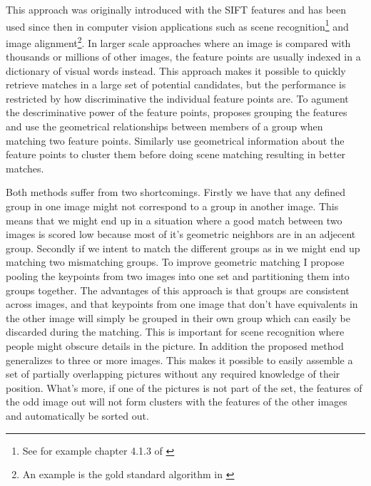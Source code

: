 \documentclass{article}
\begin{document}

 This approach was originally introduced with the SIFT features and has 
been used since then in computer vision applications such as scene 
recognition\footnote{See for example chapter 4.1.3 of \cite[pp.  
226]{szeliski2010}} and image alignment\footnote{An example is the gold 
standard algorithm in \cite[p.  114]{multipleView}}.  In larger scale 
approaches where an image is compared with thousands or millions of 
other images, the feature points are usually indexed in a dictionary of 
visual words instead. This approach makes it possible to quickly 
retrieve matches in a large set of potential candidates, but the 
performance is restricted by how discriminative the individual feature 
points are. To agument the descriminative power of the feature points, 
\cite{wu2009bundling} proposes grouping the features and use the 
geometrical relationships between members of a group when matching two 
feature points. Similarly \cite{das2008event} use geometrical 
information about the feature points to cluster them before doing scene 
matching resulting in better matches.

Both methods suffer from two shortcomings. Firstly we have that any 
defined group in one image might not correspond to a group in another 
image.  This means that we might end up in a situation where a good 
match between two images is scored low because most of it's geometric 
neighbors are in an adjecent group. Secondly if we intent to match the 
different groups as in \cite{wu2009bundling} we might end up matching 
two mismatching groups. To improve geometric matching I propose pooling 
the keypoints from two images into one set and partitioning them into 
groups together.  The advantages of this approach is that groups are 
consistent across images, and that keypoints from one image that don't 
have equivalents in the other image will simply be grouped in their own 
group which can easily be discarded during the matching. This is 
important for scene recognition where people might obscure details in 
the picture. In addition the proposed method generalizes to three or 
more images.  This makes it possible to easily assemble a set of 
partially overlapping pictures without any required knowledge of their 
position.  What's more, if one of the pictures is not part of the set, 
the features of the odd image out will not form clusters with the 
features of the other images and automatically be sorted out. 
\end{document}

